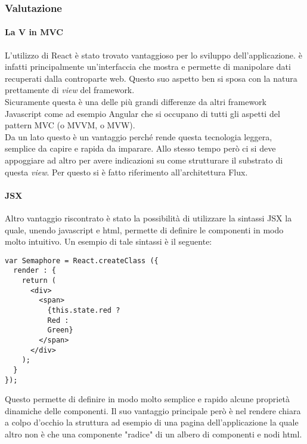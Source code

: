 \subsubsection{Valutazione}

\paragraph{La V in MVC}\label{just-the-view}
L'utilizzo di React è stato trovato vantaggioso per lo sviluppo dell'applicazione.
\fiscoloMobile{} è infatti principalmente un'interfaccia che mostra e permette di
manipolare dati recuperati dalla controparte web. Questo suo aspetto ben si sposa
con la natura prettamente di \textit{view} del framework. \\

Sicuramente questa è una delle più grandi differenze da altri framework Javascript
come ad esempio Angular che si occupano di tutti gli aspetti del pattern MVC 
(o MVVM, o MVW). \\

Da un lato questo è un vantaggio perché rende questa tecnologia leggera, semplice da
capire e rapida da imparare. Allo stesso tempo però ci si deve appoggiare ad altro
per avere indicazioni su come strutturare il substrato di questa \textit{view}. Per
questo si è fatto riferimento all'architettura Flux. \\

\paragraph{JSX}
Altro vantaggio riscontrato è stato la possibilità di utilizzare la sintassi JSX
la quale, unendo javascript e html, permette di definire le componenti in modo molto
intuitivo. Un esempio di tale sintassi è il seguente:

\begin{verbatim}
var Semaphore = React.createClass ({
  render : {
    return (
      <div>
        <span>
          {this.state.red ?
          Red :
          Green}
        </span>
      </div>	
    );
  }
});
\end{verbatim}

Questo permette di definire in modo molto semplice e rapido alcune proprietà dinamiche
delle componenti. Il suo vantaggio principale però è nel rendere chiara a colpo d'occhio
la struttura ad esempio di una pagina dell'applicazione la quale altro non è che una
componente "radice" di un albero di componenti e nodi html.

